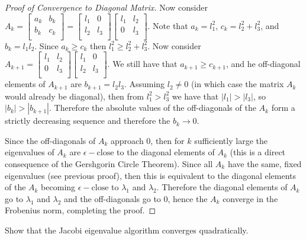 \documentclass[10pt,a4paper]{article}
\newenvironment{problem}[2][Problem]{\begin{trivlist}
\item[\hskip \labelsep {\bfseries #1}\hskip \labelsep {\bfseries #2.}]}{\end{trivlist}}
\begin{document}
\begin{proof}[Proof of Convergence to Diagonal Matrix]
  Now consider $A_k = \left[ \begin{array}{cc} a_k & b_k \\ b_k & c_k\\ \end{array} \right] = \left[ \begin{array}{cc} l_1 & 0 \\ l_2 & l_3\\ \end{array} \right] \left[ \begin{array}{cc} l_1 & l_2 \\ 0 & l_3\\ \end{array} \right]$.  Note that $a_k = l_1^2$, $c_k = l_2^2 + l_3^2$, and $b_k = l_1 l_2 $.  Since $a_k \geq c_k$ then $l_1^2 \geq l_2^2 + l_3^2$.  Now consider $A_{k+1} = \left[ \begin{array}{cc} l_1 & l_2 \\ 0 & l_3\\ \end{array} \right] \left[ \begin{array}{cc} l_1 & 0 \\ l_2 & l_3\\ \end{array} \right]$.  We still have that $a_{k+1} \geq c_{k+1}$, and he off-diagonal elements of $A_{k+1}$ are $b_{k+1} = l_2 l_3$. Assuming $l_2 \neq 0$ (in which case the matrix $A_k$ would already be diagonal), then from $l_1^2 > l_3^2$  we have that $|l_1| > |l_3|$, so $|b_k| > |b_{k+1}|$.  Therefore the absolute values of the off-diagonals of the $A_k$ form a strictly decreasing sequence and therefore the $b_k \rightarrow 0$.\

  Since the off-diagonals of $A_k$ approach 0, then for $k$ sufficiently large the eigenvalues of $A_k$ are $\epsilon-\text{close}$ to the diagonal elements of $A_k$ (this is a direct consequence of the Gershgorin Circle Theorem).  Since all $A_k$ have the same, fixed eigenvalues (see previous proof), then this is equivalent to the diagonal elements of the $A_k$ becoming $\epsilon-\text{close}$ to $\lambda_1$ and $\lambda_2$.  Therefore the diagonal elements of $A_k$ go to $\lambda_1$ and $\lambda_2$ and the off-diagonals go to $0$, hence the $A_k$ converge in the Frobenius norm, completing the proof.
\end{proof}


\begin{problem}{2}
Show that the Jacobi eigenvalue algorithm converges quadratically.
\end{problem}
\end{document}
